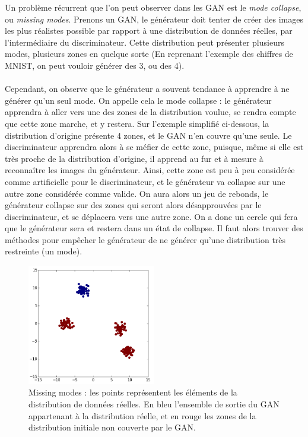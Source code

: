 Un problème récurrent que l'on peut observer dans les GAN est le \textit{mode collapse}, ou \textit{missing modes}. Prenons un GAN, le générateur doit tenter de créer des images les plus réalistes possible par rapport à une distribution de données réelles, par l'intermédiaire du discriminateur. Cette distribution peut présenter plusieurs modes, plusieurs zones en quelque sorte (En reprenant l'exemple des chiffres de MNIST, on peut vouloir générer des 3, ou des 4). 
\\ \\
Cependant, on observe que le générateur a souvent tendance à apprendre à ne générer qu'un seul mode. On appelle cela le mode collapse : le générateur apprendra à aller vers une des zones de la distribution voulue, se rendra compte que cette zone marche, et y restera. 
Sur l'exemple simplifié ci-dessous, la distribution d'origine présente 4 zones, et le GAN n'en couvre qu'une seule.
Le discriminateur apprendra alors à se méfier de cette zone, puisque, même si elle est très proche de la distribution d'origine, il apprend au fur et à mesure à reconnaître les images du générateur. Ainsi, cette zone est peu à peu considérée comme artificielle pour le discriminateur, et le générateur va collapse sur une autre zone considérée comme valide. On aura alors un jeu de rebonds, le générateur collapse sur des zones qui seront alors désapprouvées par le discriminateur, et se déplacera vers une autre zone. 
On a donc un cercle qui fera que le générateur sera et restera dans un état de collapse. 
Il faut alors trouver des méthodes pour empêcher le générateur de ne générer qu'une distribution très restreinte (un mode).

\begin{figure}[ht]
\begin{center}
\includegraphics[width=0.5\textwidth]{images/missing_modes.png}\caption{Missing modes : les points représentent les éléments de la distribution de données réelles. En bleu l'ensemble de sortie du GAN appartenant à la distribution réelle, et en rouge les zones de la distribution initiale non couverte par le GAN.}
\end{center}
\end{figure} 

